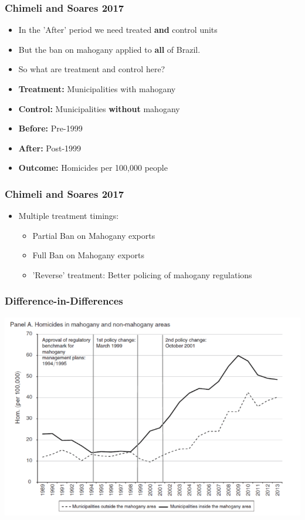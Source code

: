 \documentclass[xcolor=x11names,compress]{beamer}\usepackage[]{graphicx}\usepackage[]{color}
\renewcommand{\(}{\begin{columns}}
\renewcommand{\)}{\end{columns}}
\newcommand{\<}[1]{\begin{column}{#1}}
\renewcommand{\>}{\end{column}}
\begin{document}
\begin{frame}
\frametitle{Chimeli and Soares 2017}
\begin{itemize}
\item In the 'After' period we need treated \textbf{and} control units 
\pause
\item But the ban on mahogany applied to \textbf{all} of Brazil.
\pause
\item So what are treatment and control here?
\pause
\item \textbf{Treatment:} \pause Municipalities with mahogany
\pause
\item \textbf{Control:} \pause Municipalities \textbf{without} mahogany
\pause
\item \textbf{Before:} \pause Pre-1999
\pause
\item \textbf{After:} \pause Post-1999
\pause 
\item \textbf{Outcome:} \pause Homicides per 100,000 people
\end{itemize}
\end{frame}

\begin{frame}
\frametitle{Chimeli and Soares 2017}
\begin{itemize}
\item Multiple treatment timings:
\begin{itemize}
\item Partial Ban on Mahogany exports
\item Full Ban on Mahogany exports
\item 'Reverse' treatment: Better policing of mahogany regulations
\end{itemize}
\end{itemize}
\end{frame}

\begin{frame}
\frametitle{Difference-in-Differences}
\begin{center}
\includegraphics[scale=0.35]{Mahogany.png}
\end{center}
\end{frame}
\end{document}
